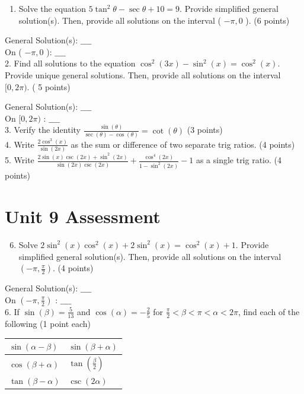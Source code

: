 \documentclass[10pt]{article}
\begin{document}
\begin{enumerate}
  \item Solve the equation $5 \tan ^{2} \theta-\sec \theta+10=9$. Provide simplified general solution(s). Then, provide all solutions on the interval ( $-\pi, 0$ ). (6 points)
\end{enumerate}

General Solution(s): $\_\_\_\_$\\
On ( $-\pi, 0$ ): $\_\_\_\_$\\
2. Find all solutions to the equation $\cos ^{2}(3 x)-\sin ^{2}(x)=\cos ^{2}(x)$. Provide unique general solutions. Then, provide all solutions on the interval $[0,2 \pi)$. ( 5 points)

General Solution(s): $\_\_\_\_$\\
On $[0,2 \pi)$ : $\_\_\_\_$\\
3. Verify the identity $\frac{\sin (\theta)}{\sec (\theta)-\cos (\theta)}=\cot (\theta)$ (3 points)\\
4. Write $\frac{2 \cos ^{3}(x)}{\sin (2 x)}$ as the sum or difference of two separate trig ratios. (4 points)\\
5. Write $\frac{2 \sin (x) \csc (2 x)+\sin ^{2}(2 x)}{\sin (2 x) \csc (2 x)}+\frac{\cos ^{4}(2 x)}{1-\sin ^{2}(2 x)}-1$ as a single trig ratio. (4 points)

\section*{Unit 9 Assessment}
\begin{enumerate}
  \setcounter{enumi}{5}
  \item Solve $2 \sin ^{2}(x) \cos ^{2}(x)+2 \sin ^{2}(x)=\cos ^{2}(x)+1$. Provide simplified general solution(s). Then, provide all solutions on the interval $\left(-\pi, \frac{\pi}{2}\right)$. (4 points)
\end{enumerate}

General Solution(s): $\_\_\_\_$\\
On $\left(-\pi, \frac{\pi}{2}\right)$ : $\_\_\_\_$\\
6. If $\sin (\beta)=\frac{5}{13}$ and $\cos (\alpha)=-\frac{2}{5}$ for $\frac{\pi}{2}<\beta<\pi<\alpha<2 \pi$, find each of the following (1 point each)

\begin{center}
\begin{tabular}{|l|l|}
\hline
$\sin (\alpha-\beta)$ & $\sin (\beta+\alpha)$ \\
\hline
$\cos (\beta+\alpha)$ & $\tan \left(\frac{\beta}{2}\right)$ \\
\hline
$\tan (\beta-\alpha)$ & $\csc (2 \alpha)$ \\
\hline
\end{tabular}
\end{center}
\end{document}
